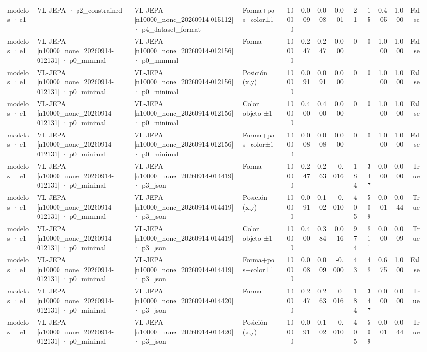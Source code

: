 \begin{tabular}{llllrrrrrrrrr}
modelos · e1 & VL-JEPA · p2\_constrained & VL-JEPA [n10000\_none\_20260914-015112] · p4\_dataset\_format & Forma+pos+color±1 & 10000 & 0.009 & 0.008 & 0.001 & 21 & 15 & 0.405 & 1.000 & False \\
modelos · e1 & VL-JEPA [n10000\_none\_20260914-012131] · p0\_minimal & VL-JEPA [n10000\_none\_20260914-012156] · p0\_minimal & Forma & 10000 & 0.247 & 0.247 & 0.000 & 0 & 0 & 1.000 & 1.000 & False \\
modelos · e1 & VL-JEPA [n10000\_none\_20260914-012131] · p0\_minimal & VL-JEPA [n10000\_none\_20260914-012156] · p0\_minimal & Posición (x,y) & 10000 & 0.091 & 0.091 & 0.000 & 0 & 0 & 1.000 & 1.000 & False \\
modelos · e1 & VL-JEPA [n10000\_none\_20260914-012131] · p0\_minimal & VL-JEPA [n10000\_none\_20260914-012156] · p0\_minimal & Color objeto ±1 & 10000 & 0.400 & 0.400 & 0.000 & 0 & 0 & 1.000 & 1.000 & False \\
modelos · e1 & VL-JEPA [n10000\_none\_20260914-012131] · p0\_minimal & VL-JEPA [n10000\_none\_20260914-012156] · p0\_minimal & Forma+pos+color±1 & 10000 & 0.008 & 0.008 & 0.000 & 0 & 0 & 1.000 & 1.000 & False \\
modelos · e1 & VL-JEPA [n10000\_none\_20260914-012131] · p0\_minimal & VL-JEPA [n10000\_none\_20260914-014419] · p3\_json & Forma & 10000 & 0.247 & 0.263 & -0.016 & 184 & 347 & 0.000 & 0.000 & True \\
modelos · e1 & VL-JEPA [n10000\_none\_20260914-012131] · p0\_minimal & VL-JEPA [n10000\_none\_20260914-014419] · p3\_json & Posición (x,y) & 10000 & 0.091 & 0.102 & -0.010 & 405 & 509 & 0.001 & 0.044 & True \\
modelos · e1 & VL-JEPA [n10000\_none\_20260914-012131] · p0\_minimal & VL-JEPA [n10000\_none\_20260914-014419] · p3\_json & Color objeto ±1 & 10000 & 0.400 & 0.384 & 0.016 & 974 & 811 & 0.000 & 0.009 & True \\
modelos · e1 & VL-JEPA [n10000\_none\_20260914-012131] · p0\_minimal & VL-JEPA [n10000\_none\_20260914-014419] · p3\_json & Forma+pos+color±1 & 10000 & 0.008 & 0.009 & -0.000 & 43 & 48 & 0.675 & 1.000 & False \\
modelos · e1 & VL-JEPA [n10000\_none\_20260914-012131] · p0\_minimal & VL-JEPA [n10000\_none\_20260914-014420] · p3\_json & Forma & 10000 & 0.247 & 0.263 & -0.016 & 184 & 347 & 0.000 & 0.000 & True \\
modelos · e1 & VL-JEPA [n10000\_none\_20260914-012131] · p0\_minimal & VL-JEPA [n10000\_none\_20260914-014420] · p3\_json & Posición (x,y) & 10000 & 0.091 & 0.102 & -0.010 & 405 & 509 & 0.001 & 0.044 & True \\

\end{tabular}
